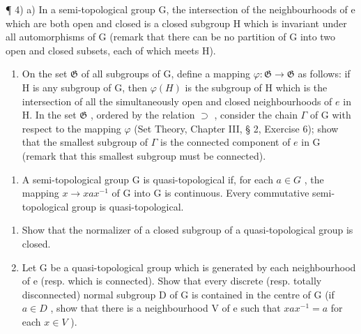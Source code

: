 ¶ 4) a) In a semi-topological group G, the intersection of the neighbourhoods of e which are both open and closed is a closed subgroup H which is invariant under all automorphisms of G (remark that there can be no partition of G into two open and closed subsets, each of which meets H).

\begin{enumerate}
\def\labelenumi{\alph{enumi})}
\setcounter{enumi}{1}
\tightlist
\item
  On the set \(\mathfrak{G}\) of all subgroups of G, define a mapping \(\varphi: \mathfrak{G} \to \mathfrak{G}\) as follows: if H is any subgroup of G, then \(\varphi(H)\) is the subgroup of H which is the intersection of all the simultaneously open and closed neighbourhoods of \(e\) in H. In the set \(\mathfrak{G}\) , ordered by the relation \(\supset\) , consider the chain \(\Gamma\) of G with respect to the mapping \(\varphi\) (Set Theory, Chapter III, § 2, Exercise 6); show that the smallest subgroup of \(\Gamma\) is the connected component of \(e\) in G (remark that this smallest subgroup must be connected).
\end{enumerate}

\begin{enumerate}
\def\labelenumi{\arabic{enumi})}
\setcounter{enumi}{4}
\tightlist
\item
  A semi-topological group G is quasi-topological if, for each \(a \in G\) , the mapping \(x \to xax^{-1}\) of G into G is continuous. Every commutative semi-topological group is quasi-topological.
\end{enumerate}

\begin{enumerate}
\def\labelenumi{\alph{enumi})}
\item
  Show that the normalizer of a closed subgroup of a quasi-topological group is closed.
\item
  Let G be a quasi-topological group which is generated by each neighbourhood of e (resp. which is connected). Show that every discrete (resp. totally disconnected) normal subgroup D of G is contained in the centre of G (if \(a \in D\) , show that there is a neighbourhood V of e such that \(xax^{-1} = a\) for each \(x \in V\) ).
\end{enumerate}

